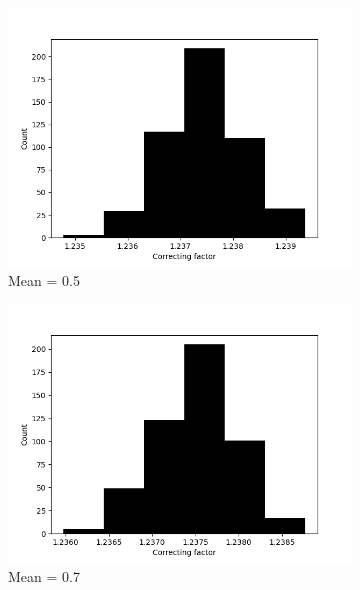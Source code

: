 \begin{figure}[!htbp]
\begin{subfigure}{0.45\textwidth}
    \includegraphics[width=1\textwidth]{./images/robust_approx/correcting_factors_hadamard_mean_10_05.png}
    \caption{Mean = 0.5}
  \end{subfigure} 
  \begin{subfigure}{0.45\textwidth}
    \centering
    \includegraphics[width=1\textwidth]{./images/robust_approx/correcting_factors_hadamard_mean_10_07.png}
    \caption{Mean = 0.7}
  \end{subfigure} 
  \begin{subfigure}{0.45\textwidth}
    \centering

\end{subfigure}
\end{figure}
